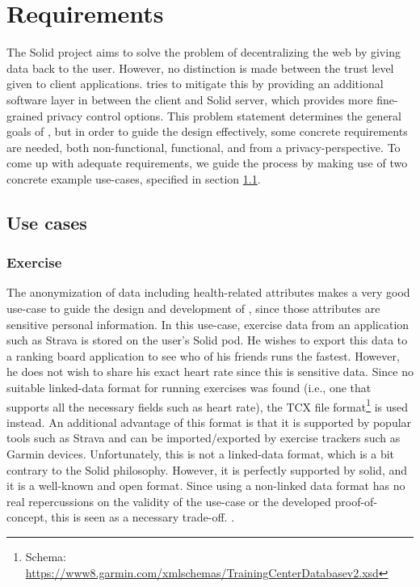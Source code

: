 \chapter{Requirements}
\label{cha:middleware}
The Solid project aims to solve the problem of decentralizing the web by giving data back to the user. However, no distinction is made between the trust level given to client applications. \middleware{} tries to mitigate this by providing an additional software layer in between the client and Solid server, which provides more fine-grained privacy control options. This problem statement determines the general goals of \middleware{}, but in order to guide the design effectively, some concrete requirements are needed, both non-functional, functional, and from a privacy-perspective. To come up with adequate requirements, we guide the process by making use of two concrete example use-cases, specified in section \ref{sec:usecases}.   

\section{Use cases}
\label{sec:usecases}
\subsection{Exercise}
The anonymization of data including health-related attributes makes a very good use-case to guide the design and development of \middleware{}, since those attributes are sensitive personal information. In this use-case, exercise data from an application such as Strava is stored on the user's Solid pod. He wishes to export this data to a ranking board application to see who of his friends runs the fastest. However, he does not wish to share his exact heart rate since this is sensitive data. Since no suitable linked-data format for running exercises was found (i.e., one that supports all the necessary fields such as heart rate), the \gls{TCX} file format\footnote{Schema: \url{https://www8.garmin.com/xmlschemas/TrainingCenterDatabasev2.xsd}} is used instead. An additional advantage of this format is that it is supported by popular tools such as Strava and can be imported/exported by exercise trackers such as Garmin devices. Unfortunately, this is not a linked-data format, which is a bit contrary to the Solid philosophy. However, it is perfectly supported by solid, and it is a well-known and open format. Since using a non-linked data format has no real repercussions on the validity of the use-case or the developed proof-of-concept, this is seen as a necessary trade-off. .

